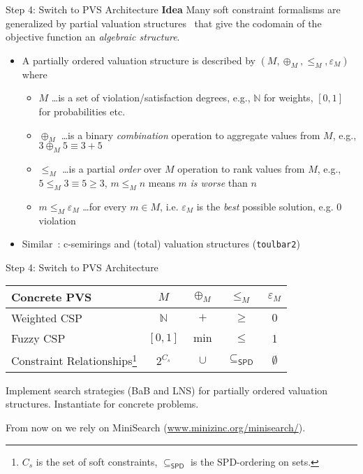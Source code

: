 \documentclass[10pt,xcolor={dvipsnames},fleqn]{beamer}
\begin{document}
\begin{frame}[fragile]{Step 4: Switch to PVS Architecture}
\textbf{Idea} Many soft constraint formalisms are generalized by \alert{partial valuation structures}~\cite{Gadducci2013} that
give the codomain of the objective function an \emph{algebraic structure}.
\begin{itemize}
\item A partially ordered valuation structure is described by $(M, \oplus_M, \leq_M, \varepsilon_M)$ where 
\begin{itemize}
\item $M$ \ldots is a set of violation/satisfaction degrees, e.g., $\mathbb{N}$ for weights, $[0,1]$ for probabilities etc.
\item $\oplus_M$ \ldots is a binary \emph{combination} operation to aggregate values from $M$, e.g., $3 \oplus_M  5 \equiv 3 + 5$
\item $\leq_M$ \ldots is a partial \emph{order} over $M$ operation to rank values from $M$, e.g., $5 \leq_M  3 \equiv 5 \geq 3$, $m \leq_M n$ means $m$ \emph{is worse} than $n$
\item $m \leq_M \varepsilon_M$ \ldots for every $m \in M$, i.e. $\varepsilon_M$ is the \emph{best} possible solution, e.g. $0$ violation 
\end{itemize}
\item Similar~\cite{Bistarelli1999}: c-semirings and (total) valuation structures (\texttt{toulbar2})
\end{itemize}
\end{frame}

\begin{frame}[fragile]{Step 4: Switch to PVS Architecture}
\begin{center}
\begin{tabular}{l|c|c|c|c}
\textbf{Concrete PVS} & $M$ & $\oplus_M$ & $\leq_M$ & $\varepsilon_M$ \\ 
\hline 
Weighted CSP & $\mathbb{N}$ & $+$ & $\geq$ & $0$ \\ 
Fuzzy CSP & $[0,1]$ & $\min$ & $\leq$  & 1 \\ 
Constraint Relationships\footnote{$C_s$ is the set of soft constraints, $\subseteq_{\mathsf{SPD}}$ is the SPD-ordering on sets.} &$2^{C_s}$ & $\cup$ & $\subseteq_{\mathsf{SPD}}$ & $\emptyset$ \\ 
\end{tabular} 
\end{center}

\begin{parchment}
Implement search strategies (BaB and LNS) for partially ordered valuation structures. Instantiate for concrete problems.
\end{parchment}
\alert{From now on we rely on MiniSearch (\url{www.minizinc.org/minisearch/}).}
\end{frame}
\end{document}
